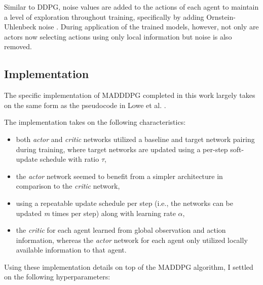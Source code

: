 \documentclass[11pt]{article}
\begin{document}
	Similar to DDPG, noise values are added to the actions of each agent to maintain a level of exploration throughout training, specifically by adding Ornstein-Uhlenbeck noise \cite{ddpg}. During application of the trained models, however, not only are actors now selecting actions using only local information but noise is also removed.
	
	\subsection{Implementation}
	
	The specific implementation of MADDDPG completed in this work largely takes on the same form as the pseudocode in Lowe et al. \cite{maddpg}.
	
	The implementation takes on the following characteristics:
	\begin{itemize}
		\item both \textit{actor} and \textit{critic} networks utilized a baseline and target network pairing during training, where target networks are updated using a per-step soft-update schedule with ratio $\tau$,
		\item the \textit{actor} network seemed to benefit from a simpler architecture in comparison to the \textit{critic} network,
		\item using a repeatable update schedule per step (i.e., the networks can be updated \textit{m} times per step) along with learning rate $\alpha$,
		\item the \textit{critic} for each agent learned from global observation and action information, whereas the \textit{actor} network for each agent only utilized locally available information to that agent.
	\end{itemize}
	
	\FloatBarrier
	
	Using these implementation details on top of the MADDPG algorithm, I settled on the following hyperparameters:
	
	\FloatBarrier
	
\end{document}
